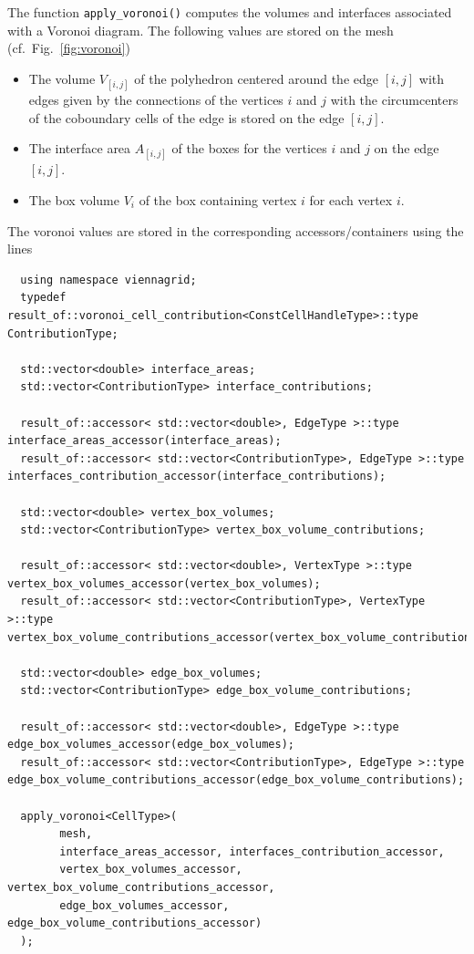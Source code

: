  The function \lstinline|apply_voronoi()| computes the volumes and interfaces associated with a Voronoi diagram. The following values are stored on the mesh (cf.~Fig.~\ref{fig:voronoi})
 \begin{itemize}
  \item The volume $V_{[i,j]}$ of the polyhedron centered around the edge $[i,j]$ with edges given by the connections of the vertices $i$ and $j$ with the circumcenters of the coboundary cells of the edge is stored on the edge $[i,j]$.
  \item The interface area $A_{[i,j]}$ of the boxes for the vertices $i$ and $j$ on the edge $[i,j]$.
  \item The box volume $V_i$ of the box containing vertex $i$ for each vertex $i$.
 \end{itemize}
 The voronoi values are stored in the corresponding accessors/containers using the lines
 \begin{lstlisting}
  using namespace viennagrid;
  typedef result_of::voronoi_cell_contribution<ConstCellHandleType>::type ContributionType;

  std::vector<double> interface_areas;
  std::vector<ContributionType> interface_contributions;

  result_of::accessor< std::vector<double>, EdgeType >::type interface_areas_accessor(interface_areas);
  result_of::accessor< std::vector<ContributionType>, EdgeType >::type interfaces_contribution_accessor(interface_contributions);

  std::vector<double> vertex_box_volumes;
  std::vector<ContributionType> vertex_box_volume_contributions;

  result_of::accessor< std::vector<double>, VertexType >::type vertex_box_volumes_accessor(vertex_box_volumes);
  result_of::accessor< std::vector<ContributionType>, VertexType >::type vertex_box_volume_contributions_accessor(vertex_box_volume_contributions);

  std::vector<double> edge_box_volumes;
  std::vector<ContributionType> edge_box_volume_contributions;

  result_of::accessor< std::vector<double>, EdgeType >::type edge_box_volumes_accessor(edge_box_volumes);
  result_of::accessor< std::vector<ContributionType>, EdgeType >::type edge_box_volume_contributions_accessor(edge_box_volume_contributions);

  apply_voronoi<CellType>(
        mesh,
        interface_areas_accessor, interfaces_contribution_accessor,
        vertex_box_volumes_accessor, vertex_box_volume_contributions_accessor,
        edge_box_volumes_accessor, edge_box_volume_contributions_accessor)
  );
 \end{lstlisting}

 
